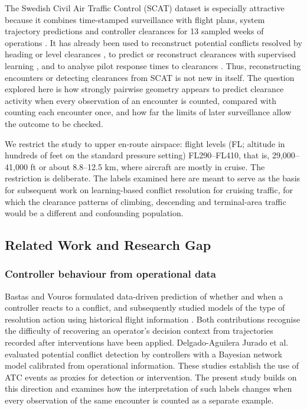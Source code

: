 \documentclass[aerospace,article,submit,moreauthors]{Definitions/mdpi}
\begin{document}
The Swedish Civil Air Traffic Control (SCAT) dataset is especially attractive because it combines time-stamped surveillance with flight plans, system trajectory predictions and controller clearances for 13 sampled weeks of operations \cite{nilsson2023}. It has already been used to reconstruct potential conflicts resolved by heading or level clearances \cite{renkhoff2025}, to predict or reconstruct clearances with supervised learning \cite{renkhoff2026}, and to analyse pilot response times to clearances \cite{wustenbecker2025}. Thus, reconstructing encounters or detecting clearances from SCAT is not new in itself. The question explored here is how strongly pairwise geometry appears to predict clearance activity when every observation of an encounter is counted, compared with counting each encounter once, and how far the limits of later surveillance allow the outcome to be checked.

We restrict the study to upper en-route airspace: flight levels (FL; altitude in hundreds of feet on the standard pressure setting) FL290--FL410, that is, 29,000--41,000 ft or about 8.8--12.5 km, where aircraft are mostly in cruise. The restriction is deliberate. The labels examined here are meant to serve as the basis for subsequent work on learning-based conflict resolution for cruising traffic, for which the clearance patterns of climbing, descending and terminal-area traffic would be a different and confounding population.

\subsection{Related Work and Research Gap}\label{sec:related}
\subsubsection{Controller behaviour from operational data}
Bastas and Vouros \cite{bastas2022} formulated data-driven prediction of whether and when a controller reacts to a conflict, and subsequently studied models of the type of resolution action using historical flight information \cite{bastas2023}. Both contributions recognise the difficulty of recovering an operator's decision context from trajectories recorded after interventions have been applied. Delgado-Aguilera Jurado et al. \cite{delgado2022} evaluated potential conflict detection by controllers with a Bayesian network model calibrated from operational information. These studies establish the use of ATC events as proxies for detection or intervention. The present study builds on this direction and examines how the interpretation of such labels changes when every observation of the same encounter is counted as a separate example.
\end{document}
